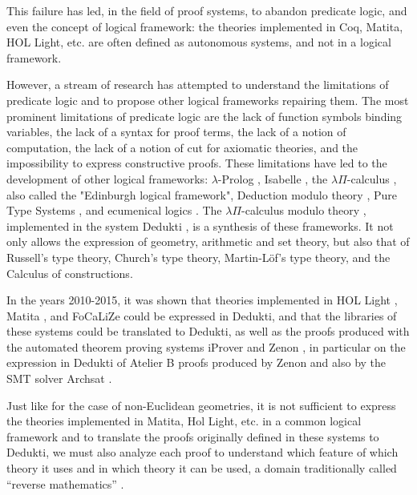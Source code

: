 This failure has led, in the field of proof systems, to abandon
predicate logic, and even the concept of logical framework: the
theories implemented in {\sc Coq}, {\sc Matita}, {\sc HOL Light},
etc. are often defined as autonomous systems, and not in a logical
framework.

However, a stream of research has attempted to understand the
limitations of predicate logic and to propose other logical frameworks
repairing them. The most prominent limitations of predicate logic are
the lack of function symbols binding variables, the lack of a syntax
for proof terms, the lack of a notion of computation, the lack of a
notion of cut for axiomatic theories, and the impossibility to express
constructive proofs. These limitations have led to the development of
other logical frameworks: $\lambda$-Prolog \cite{NadathurMiller88,
  MillerNadathur12}, Isabelle \cite{Paulson90}, the $\lambda
\Pi$-calculus \cite{HarperHonsellPlotkin91}, also called the
"Edinburgh logical framework", Deduction modulo theory
\cite{DowekHardinKirchner03, DowekWerner03}, Pure Type Systems
\cite{Berardi88,Terlouw89}, and ecumenical logics
\cite{Prawitz15,Dowek15,PereiraRodriguez17}. The $\lambda
\Pi$-calculus modulo theory \cite{CousineauDowek07}, implemented in
the system {\sc Dedukti} \cite{Assaf16}, is a synthesis of these
frameworks. It not only allows the expression of geometry, arithmetic
and set theory, but also that of Russell's type theory, Church's type
theory, Martin-L\"of's type theory, and the Calculus of constructions.

In the years 2010-2015, it was shown that theories implemented in {\sc
HOL Light} \cite{Assaf12}, {\sc Matita} \cite{Assaf15}, and {\sc
FoCaLiZe} \cite{Cauderlier16} could be expressed in {\sc Dedukti},
and that the libraries of these systems could be translated to {\sc
Dedukti}, as well as the proofs produced with the automated theorem
proving systems {\sc iProver} \cite{Burel10} and {\sc Zenon}
\cite{CauderlierHalmagrand15}, in particular on the expression in {\sc
  Dedukti} of {\sc Atelier B} proofs produced by {\sc Zenon} and also
by the SMT solver {\sc Archsat} \cite{Bury19}.

Just like for the case of non-Euclidean geometries, it is not
sufficient to express the theories implemented in {\sc Matita}, {\sc
  Hol Light}, etc.  in a common logical framework and to translate the
proofs originally defined in these systems to {\sc Dedukti}, we must
also analyze each proof to understand which feature of which theory it
uses and in which theory it can be used, a domain traditionally called
“reverse mathematics” \cite{Friedman76,Simpson09,Dowek17}.


